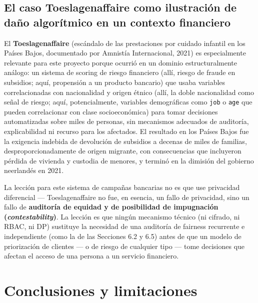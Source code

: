 \documentclass[11pt,a4paper]{article}
\begin{document}
\subsection{El caso Toeslagenaffaire como ilustración de daño algorítmico en un contexto financiero}

El \textbf{Toeslagenaffaire} (escándalo de las prestaciones por cuidado infantil en los Países
Bajos, documentado por Amnistía Internacional, 2021) es especialmente relevante para este proyecto
porque ocurrió en un dominio estructuralmente análogo: un sistema de scoring de riesgo financiero
(allí, riesgo de fraude en subsidios; aquí, propensión a un producto bancario) que usaba variables
correlacionadas con nacionalidad y origen étnico (allí, la doble nacionalidad como señal de riesgo;
aquí, potencialmente, variables demográficas como \texttt{job} o \texttt{age} que pueden
correlacionar con clase socioeconómica) para tomar decisiones automatizadas sobre miles de
personas, sin mecanismos adecuados de auditoría, explicabilidad ni recurso para los afectados. El
resultado en los Países Bajos fue la exigencia indebida de devolución de subsidios a decenas de
miles de familias, desproporcionadamente de origen migrante, con consecuencias que incluyeron
pérdida de vivienda y custodia de menores, y terminó en la dimisión del gobierno neerlandés en
2021.

La lección para este sistema de campañas bancarias no es que use privacidad diferencial ---
Toeslagenaffaire no fue, en esencia, un fallo de privacidad, sino un fallo de \textbf{auditoría de
equidad y de posibilidad de impugnación (\emph{contestability})}. La lección es que ningún
mecanismo técnico (ni cifrado, ni RBAC, ni DP) sustituye la necesidad de una auditoría de fairness
recurrente e independiente (como la de las Secciones 6.2 y 6.5) antes de que un modelo de
priorización de clientes --- o de riesgo de cualquier tipo --- tome decisiones que afectan el
acceso de una persona a un servicio financiero.

\section{Conclusiones y limitaciones}
\end{document}
